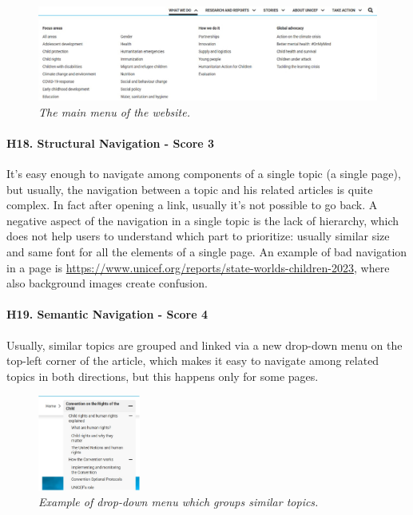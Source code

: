 \begin{figure}[!h]
	\begin{center}
		\includegraphics[width=\textwidth]{FinalScores20.jpg}
		\captionsetup{font=small}
		\caption{\textit{The main menu of the website.}}
	\end{center}
\end{figure}
\newline
\newline \paragraph{H18. Structural Navigation - Score 3}  \label{subsec:H18}	It’s easy enough to navigate among components of a single topic (a single page), but usually, the navigation between a topic and his related articles is quite complex. In fact after opening a link, usually it’s not possible to go back.
\newline A negative aspect of the navigation in a single topic is the lack of hierarchy, which does not help users to understand which part to prioritize: usually similar size and same font for all the elements of a single page.
\newline An example of bad navigation in a page is \href{https://www.unicef.org/reports/state-worlds-children-2023}{https://www.unicef.org/reports/state-worlds-children-2023}, where also background images create confusion.
\newline
\newline \paragraph{H19. Semantic Navigation - Score 4}  \label{subsec:H19}	Usually, similar topics are grouped and linked via a new drop-down menu on the top-left corner of the article, which makes it easy to navigate among related topics in both directions, but this happens only for some pages.
\begin{figure}[!h]
	\begin{center}
		\includegraphics[width=0.3\textwidth]{FinalScores21.jpg}
		\captionsetup{font=small}
		\caption{\textit{Example of drop-down menu which groups similar topics.}}
	\end{center}
\end{figure}
